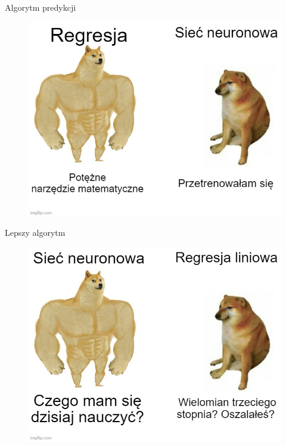 \documentclass[11pt]{beamer}
\begin{document}
\begin{frame}{Algorytm predykcji}
\begin{figure}
\includegraphics[scale=0.4]{../img/regresja.jpg} 
\end{figure}
\end{frame}

\begin{frame}{Lepszy algorytm}
\begin{figure}
\includegraphics[scale=0.4]{../img/regresja2.jpg} 
\end{figure}
\end{frame}
\end{document}
